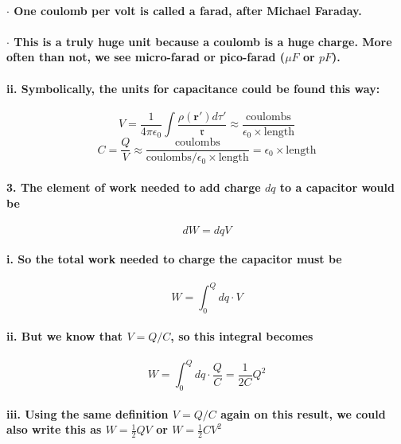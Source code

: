 \documentclass{article}
\begin{document}
\paragraph{\indent\indent $\cdot$ One coulomb per volt is called a farad, after Michael Faraday.}
\paragraph{\indent\indent $\cdot$ This is a truly huge unit because a coulomb is a huge charge. More often than not, we see micro-farad or pico-farad ($\mu F$ or $pF$).}
\paragraph{\indent\indent ii. Symbolically, the units for capacitance could be found this way:}
\begin{equation*}
    V=\frac{1}{4\pi\epsilon_0}\int\frac{\rho(\boldsymbol{r}')d\tau'}{\mathfrak{r}}\approx\frac{\text{coulombs}}{\epsilon_0\times \text{length}}
\end{equation*}
\begin{equation*}
    C=\frac{Q}{V}\approx\frac{\text{coulombs}}{\text{coulombs/}\epsilon_0\times \text{length}}=\epsilon_0\times \text{length}
\end{equation*}
\paragraph{3. The element of work needed to add charge $dq$ to a capacitor would be}
\begin{equation*}
    dW=dqV
\end{equation*}
\paragraph{\indent i. So the total work needed to charge the capacitor must be}
\begin{equation*}
    W=\int_{0}^{Q} dq\cdot V
\end{equation*}
\paragraph{\indent ii. But we know that $V=Q/C$, so this integral becomes}
\begin{equation*}
    W=\int_0^Q dq\cdot\frac{Q}{C}=\frac{1}{2C}Q^2
\end{equation*}
\paragraph{\indent iii. Using the same definition $V=Q/C$ again on this result, we could also write this as $W=\frac{1}{2}QV$ or $W=\frac{1}{2}CV^2$}
\end{document}
